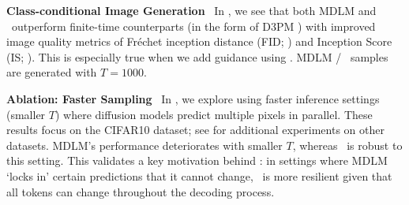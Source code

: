 \documentclass{article} %
\begin{document}
\textbf{Class-conditional Image Generation}~
In , we see that both MDLM and \method~outperform finite-time counterparts (in the form of D3PM \citep{austin2021structured}) with improved image quality metrics of Fr\'echet inception distance (FID; \citet{heusel2017gans}) and Inception Score (IS; \citet{salimans2016improved}).
This is especially true when we add guidance using \cfg.
MDLM / \method~samples are generated with $T=1000$.

\textbf{Ablation: Faster Sampling}~
In , we explore using faster inference settings (smaller $T$) where diffusion models predict multiple pixels in parallel.
These results focus on the CIFAR10 dataset; see  for additional experiments on other datasets.
MDLM's performance deteriorates with smaller $T$, whereas \method~is robust to this setting.
This validates a key motivation behind \method: in settings where MDLM `locks in' certain predictions that it cannot change, \method~is more resilient given that all tokens can change throughout the decoding process.
\end{document}

